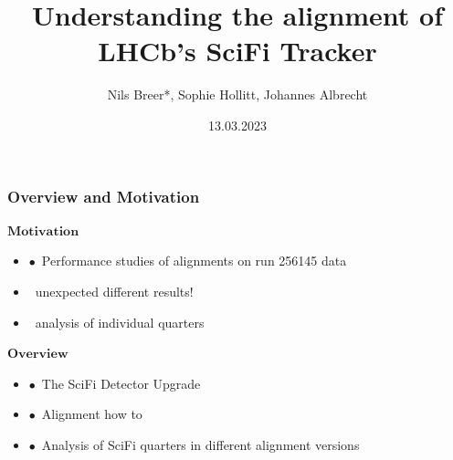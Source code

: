 \documentclass[aspectratio=1610, 12pt]{beamer}
\title{Understanding the alignment of LHCb's SciFi Tracker}
\author[N.Breer]{Nils Breer*, Sophie Hollitt, Johannes Albrecht}
\institute{TU Dortmund, Fakultät Physik}
\date{13.03.2023}
\begin{document}
\maketitle

\begin{frame}\frametitle{Overview and Motivation}
$\textbf{Motivation}$
  \begin{itemize}
    \item $\bullet$\, Performance studies of alignments on run 256145 data
    \item \to\, unexpected different results!
    \item \to\, analysis of individual quarters
  \end{itemize}
$\textbf{Overview}$
  \begin{itemize}
    \item $\bullet$\, The SciFi Detector Upgrade
    \item $\bullet$\, Alignment how to
    \item $\bullet$\, Analysis of SciFi quarters in different alignment versions
  \end{itemize}
\end{frame}
\end{document}
